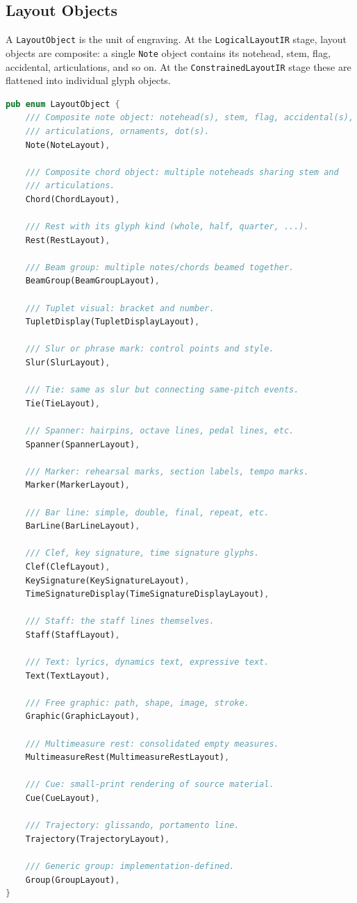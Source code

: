 \documentclass[11pt,letterpaper]{report}
\begin{document}
\subsection{Layout Objects}

A \texttt{LayoutObject} is the unit of engraving. At the
\texttt{LogicalLayoutIR} stage, layout objects are composite: a
single \texttt{Note} object contains its notehead, stem, flag,
accidental, articulations, and so on. At the
\texttt{ConstrainedLayoutIR} stage these are flattened into
individual glyph objects.

\begin{lstlisting}[language=Rust]
pub enum LayoutObject {
    /// Composite note object: notehead(s), stem, flag, accidental(s),
    /// articulations, ornaments, dot(s).
    Note(NoteLayout),

    /// Composite chord object: multiple noteheads sharing stem and
    /// articulations.
    Chord(ChordLayout),

    /// Rest with its glyph kind (whole, half, quarter, ...).
    Rest(RestLayout),

    /// Beam group: multiple notes/chords beamed together.
    BeamGroup(BeamGroupLayout),

    /// Tuplet visual: bracket and number.
    TupletDisplay(TupletDisplayLayout),

    /// Slur or phrase mark: control points and style.
    Slur(SlurLayout),

    /// Tie: same as slur but connecting same-pitch events.
    Tie(TieLayout),

    /// Spanner: hairpins, octave lines, pedal lines, etc.
    Spanner(SpannerLayout),

    /// Marker: rehearsal marks, section labels, tempo marks.
    Marker(MarkerLayout),

    /// Bar line: simple, double, final, repeat, etc.
    BarLine(BarLineLayout),

    /// Clef, key signature, time signature glyphs.
    Clef(ClefLayout),
    KeySignature(KeySignatureLayout),
    TimeSignatureDisplay(TimeSignatureDisplayLayout),

    /// Staff: the staff lines themselves.
    Staff(StaffLayout),

    /// Text: lyrics, dynamics text, expressive text.
    Text(TextLayout),

    /// Free graphic: path, shape, image, stroke.
    Graphic(GraphicLayout),

    /// Multimeasure rest: consolidated empty measures.
    MultimeasureRest(MultimeasureRestLayout),

    /// Cue: small-print rendering of source material.
    Cue(CueLayout),

    /// Trajectory: glissando, portamento line.
    Trajectory(TrajectoryLayout),

    /// Generic group: implementation-defined.
    Group(GroupLayout),
}
\end{lstlisting}
\end{document}
